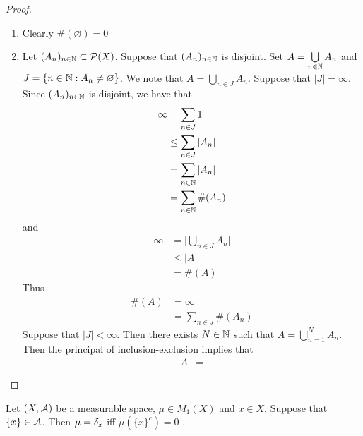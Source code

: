 \documentclass{book}
\begin{document}
	\begin{proof}\
		\begin{enumerate}
			\item Clearly $\#(\varnothing) = 0$
			\item Let $(A_n)_{n \in \mathbb{N}} \subset \mathcal{P}(X)$. Suppose that $(A_n)_{n \in \mathbb{N}}$ is disjoint. Set $A = \bigcup\limits_{n \in \mathbb{N}} A_n$ and $J = \{n \in \mathbb{N}: A_n \neq \varnothing\}$. We note that $A = \bigcup\limits_{n \in J} A_n$. Suppose that $|J| = \infty$. Since $(A_n)_{n \in \mathbb{N}}$ is disjoint, we have that 
			\begin{align*}
				\infty
				& = \sum\limits_{n \in J} 1 \\
				& \leq \sum\limits_{n \in J} |A_n| \\
				& = \sum\limits_{n \in \mathbb{N}} |A_n| \\
				& = \sum\limits_{n \in \mathbb{N}} \#(A_n) 
			\end{align*}
			and 
			\begin{align*}
				\infty
				& = \bigg| \bigcup_{n \in J} A_n \bigg| \\
				& \leq \bigg| A \bigg| \\
				& = \#(A)
			\end{align*}
			Thus 
			\begin{align*}
				\#(A) 
				& = \infty \\
				& = \sum\limits_{n \in J} \#(A_n) 
			\end{align*}
			Suppose that $|J| < \infty$. Then there exists $N \in \mathbb{N}$ such that $A = \bigcup\limits_{n=1}^N A_n$. Then the principal of inclusion-exclusion implies that 
			\begin{align*}
				A
				& = 
			\end{align*}
		\end{enumerate}
	\end{proof}

\begin{ex} 
	Let $(X, \mathcal{A})$ be a measurable space, $\mu \in M_1(X)$ and $x \in X$. Suppose that $\{x\} \in \mathcal{A}$. Then $\mu = \delta_x$ iff $\mu(\{x\}^c) = 0$ . 
\end{ex}
\end{document}
